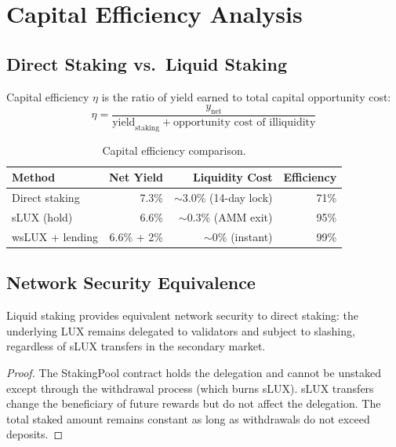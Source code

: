 \section{Capital Efficiency Analysis}
\label{sec:efficiency}

\subsection{Direct Staking vs.\ Liquid Staking}

\begin{definition}
Capital efficiency $\eta$ is the ratio of yield earned to total capital opportunity cost:
\begin{equation}
    \eta = \frac{y_{\text{net}}}{\text{yield}_{\text{staking}} + \text{opportunity cost of illiquidity}}
\end{equation}
\end{definition}

\begin{table}[H]
\centering
\caption{Capital efficiency comparison.}
\label{tab:efficiency}
\begin{tabular}{lrrr}
\toprule
\textbf{Method} & \textbf{Net Yield} & \textbf{Liquidity Cost} & \textbf{Efficiency} \\
\midrule
Direct staking & 7.3\% & $\sim$3.0\% (14-day lock) & 71\% \\
sLUX (hold) & 6.6\% & $\sim$0.3\% (AMM exit) & 95\% \\
wsLUX + lending & 6.6\% + 2\% & $\sim$0\% (instant) & 99\% \\
\bottomrule
\end{tabular}
\end{table}

\subsection{Network Security Equivalence}

\begin{theorem}
Liquid staking provides equivalent network security to direct staking: the underlying LUX remains delegated to validators and subject to slashing, regardless of sLUX transfers in the secondary market.
\end{theorem}

\begin{proof}
The StakingPool contract holds the delegation and cannot be unstaked except through the withdrawal process (which burns sLUX). sLUX transfers change the beneficiary of future rewards but do not affect the delegation. The total staked amount remains constant as long as withdrawals do not exceed deposits.
\end{proof}

